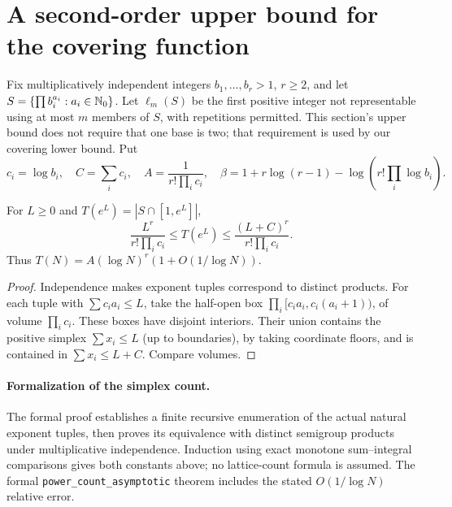 \section{A second-order upper bound for the covering function}
Fix multiplicatively independent integers $b_1,\ldots,b_r>1$, $r\ge2$,
and let $S=\{\prod b_i^{a_i}:a_i\in\mathbb N_0\}$. Let $\ell_m(S)$ be the first
positive integer not representable using at most $m$ members of $S$,
with repetitions permitted. This section's upper bound does not require
that one base is two; that requirement is used by our covering lower bound.
Put
\[
c_i=\log b_i,\quad C=\sum_i c_i,\quad
A=\frac1{r!\prod_i c_i},\quad
\beta=1+r\log(r-1)-\log\!\left(r!\prod_i\log b_i\right).
\]

\begin{lemma}\label{ext:lem:simplex}
For $L\ge0$ and $T(e^L)=|S\cap[1,e^L]|$,
\[
\frac{L^r}{r!\prod_i c_i}\le T(e^L)
\le\frac{(L+C)^r}{r!\prod_i c_i}.
\]
Thus $T(N)=A(\log N)^r(1+O(1/\log N))$.
\end{lemma}
\begin{proof}
Independence makes exponent tuples correspond to distinct products.
For each tuple with $\sum c_i a_i\le L$, take the half-open box
$\prod_i[c_i a_i,c_i(a_i+1))$, of volume $\prod_i c_i$.
These boxes have disjoint interiors. Their union contains the positive
simplex $\sum x_i\le L$ (up to boundaries), by taking coordinate floors,
and is contained in $\sum x_i\le L+C$. Compare volumes.
\end{proof}

\paragraph{Formalization of the simplex count.}
The formal proof establishes a finite recursive enumeration of the
actual natural exponent tuples, then proves its equivalence with
distinct semigroup products under multiplicative independence.
Induction using exact monotone sum--integral comparisons gives both
constants above; no lattice-count formula is assumed. The formal
\texttt{power\_\allowbreak count\_\allowbreak asymptotic} theorem
includes the stated $O(1/\log N)$ relative error.



